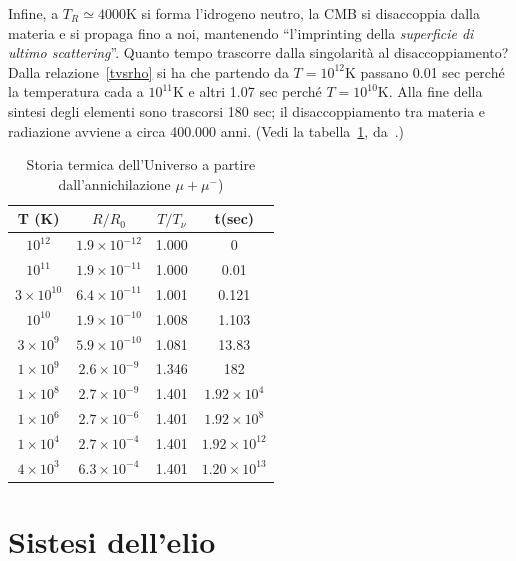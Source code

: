 Infine, a $T_R \simeq 4000$K si forma l'idrogeno neutro, la CMB si disaccoppia
dalla materia e si propaga fino a noi, mantenendo ``l'imprinting della
\emph{superficie di ultimo scattering}''.  Quanto tempo trascorre dalla
singolarità al disaccoppiamento?  Dalla relazione~\eqref{tvsrho} si ha che
partendo da $T=10^{12}$K passano 0.01 sec perché la temperatura cada a
$10^{11}$K e altri 1.07 sec perché $T=10^{10}$K.  Alla fine della sintesi degli
elementi sono trascorsi 180 sec; il disaccoppiamento tra materia e radiazione
avviene a circa 400.000 anni.  (Vedi la tabella~\ref{storia_termica},
da~\textcite[550]{weinberg:gravitation}.)
\begin{table}
  \centering{}
  \caption{Storia termica dell'Universo a partire dall'annichilazione $\mu+ \mu^-$)}
  \label{storia_termica}
  \begin{tabular}{cccc}
    \toprule
    T (K)               & $R/R_0$               & $T/T_{\nu}$ & t(sec)                \\
    \midrule
    $10^{12}  $         & $1.9 \times 10^{-12}$ & 1.000       & 0                     \\
    $10^{11}  $         & $1.9 \times 10^{-11}$ & 1.000       & 0.01                  \\
    $3 \times  10^{10}$ & $6.4 \times 10^{-11}$ & 1.001       & 0.121                 \\
    $10^{10}   $        & $1.9 \times 10^{-10}$ & 1.008       & 1.103                 \\
    $3  \times 10^{9}$  & $5.9 \times 10^{-10}$ & 1.081       & 13.83                 \\
    $1  \times 10^{9}$  & $2.6 \times 10^{-9}$  & 1.346       & 182                   \\
    $1  \times 10^{8}$  & $2.7 \times 10^{-9}$  & 1.401       & $1.92 \times 10^4$    \\
    $1  \times 10^{6}$  & $2.7 \times 10^{-6}$  & 1.401       & $1.92 \times 10^8$    \\
    $1  \times 10^{4}$  & $2.7 \times 10^{-4}$  & 1.401       & $1.92 \times 10^{12}$ \\
    $4 \times 10^{3}$   & $6.3 \times 10^{-4}$  & 1.401       & $1.20 \times 10^{13}$ \\
    \bottomrule
  \end{tabular}
\end{table}

\section{Sistesi dell'elio}


